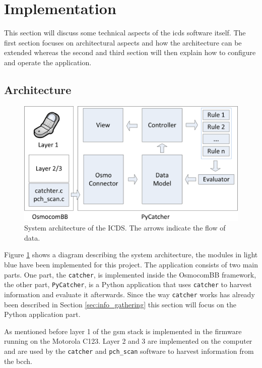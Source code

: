 \section{Implementation}
\label{sec:icds}
This section will discuss some technical aspects of the \gls{icds} software itself.
The first section focuses on architectural aspects and how the architecture can be extended whereas the second and third section will then explain how to configure and operate the application.

\subsection{Architecture}
\begin{figure}
\centering
\includegraphics{../Images/Architecture_software}
\caption{System architecture of the ICDS. The arrows indicate the flow of data.}
\label{fig:architecture}
\end{figure}
Figure \ref{fig:architecture} shows a diagram describing the system architecture, the modules in light blue have been implemented for this project.
The application consists of two main parts.
One part, the \texttt{catcher}, is implemented inside the OsmocomBB framework, the other part, \texttt{PyCatcher}, is a Python application that uses \texttt{catcher} to harvest information and evaluate it afterwards.
Since the way \texttt{catcher} works has already been described in Section \ref{sec:info_gathering} this section will focus on the Python application part.

As mentioned before layer 1 of the \gls{gsm} stack is implemented in the firmware running on the Motorola C123.
Layer 2 and 3 are implemented on the computer and are used by the \texttt{catcher} and \texttt{pch\_scan} software to harvest information from the \gls{bcch}.

